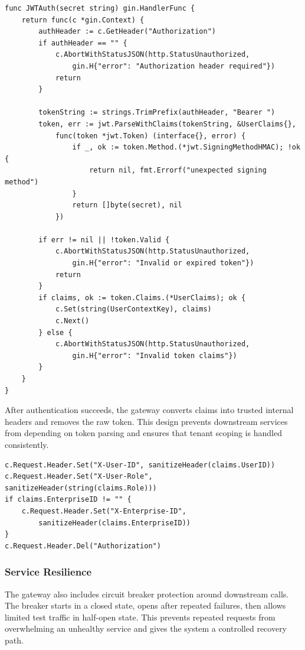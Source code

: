 \begingroup
\footnotesize
\begin{verbatim}
func JWTAuth(secret string) gin.HandlerFunc {
    return func(c *gin.Context) {
        authHeader := c.GetHeader("Authorization")
        if authHeader == "" {
            c.AbortWithStatusJSON(http.StatusUnauthorized,
                gin.H{"error": "Authorization header required"})
            return
        }

        tokenString := strings.TrimPrefix(authHeader, "Bearer ")
        token, err := jwt.ParseWithClaims(tokenString, &UserClaims{},
            func(token *jwt.Token) (interface{}, error) {
                if _, ok := token.Method.(*jwt.SigningMethodHMAC); !ok {
                    return nil, fmt.Errorf("unexpected signing method")
                }
                return []byte(secret), nil
            })

        if err != nil || !token.Valid {
            c.AbortWithStatusJSON(http.StatusUnauthorized,
                gin.H{"error": "Invalid or expired token"})
            return
        }
        if claims, ok := token.Claims.(*UserClaims); ok {
            c.Set(string(UserContextKey), claims)
            c.Next()
        } else {
            c.AbortWithStatusJSON(http.StatusUnauthorized,
                gin.H{"error": "Invalid token claims"})
        }
    }
}
\end{verbatim}
\endgroup

After authentication succeeds, the gateway converts claims into trusted internal headers and removes the raw token. This design prevents downstream services from depending on token parsing and ensures that tenant scoping is handled consistently.

\begingroup
\footnotesize
\begin{verbatim}
c.Request.Header.Set("X-User-ID", sanitizeHeader(claims.UserID))
c.Request.Header.Set("X-User-Role", sanitizeHeader(string(claims.Role)))
if claims.EnterpriseID != "" {
    c.Request.Header.Set("X-Enterprise-ID",
        sanitizeHeader(claims.EnterpriseID))
}
c.Request.Header.Del("Authorization")
\end{verbatim}
\endgroup

\subsubsection{Service Resilience}
The gateway also includes circuit breaker protection around downstream calls. The breaker starts in a closed state, opens after repeated failures, then allows limited test traffic in half-open state. This prevents repeated requests from overwhelming an unhealthy service and gives the system a controlled recovery path.

